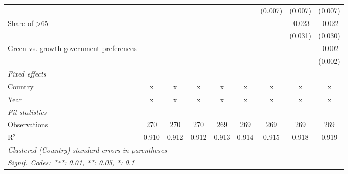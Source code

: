 \begin{table}[htbp]
\begin{tabular}{lcccccccc}
                                                  &         &         &         &         &         & (0.007) & (0.007) & (0.007)\\   
      Share of >65                                &         &         &         &         &         &         & -0.023  & -0.022\\   
                                                  &         &         &         &         &         &         & (0.031) & (0.030)\\   
      Green vs. growth government preferences     &         &         &         &         &         &         &         & -0.002\\   
                                                  &         &         &         &         &         &         &         & (0.002)\\   
      \emph{Fixed effects}\\
      Country                                     & x       & x       & x       & x       & x       & x       & x       & x\\  
      Year                                        & x       & x       & x       & x       & x       & x       & x       & x\\  
      \midrule \emph{Fit statistics}\\
      Observations                                & 270     & 270     & 270     & 269     & 269     & 269     & 269     & 269\\  
      R$^2$                                       & 0.910   & 0.912   & 0.912   & 0.913   & 0.914   & 0.915   & 0.918   & 0.919\\  
      \midrule
      \multicolumn{9}{l}{\emph{Clustered (Country) standard-errors in parentheses}}\\
      \multicolumn{9}{l}{\emph{Signif. Codes: ***: 0.01, **: 0.05, *: 0.1}}\\
   \end{tabular}
\end{table}


